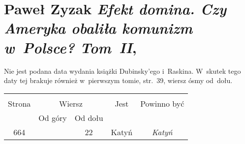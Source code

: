 \documentclass[a4paper,11pt]{article}
\numberwithin{equation}{section}
\begin{document}










\section{Paweł Zyzak \textit{Efekt domina. Czy Ameryka
    obaliła komunizm w~Polsce? Tom~II},
  \cite{ZyzakEfektDominaVolII2016} }




 Nie jest podana data wydania książki
Dubinsky'ego i~Raskina. W~skutek tego daty tej brakuje również
w~pierwszym tomie, str.~39, wiersz ósmy od~dołu.







\begin{center}

  \begin{tabular}{|c|c|c|c|c|}
    \hline
    & \multicolumn{2}{c|}{} & & \\
    Strona & \multicolumn{2}{c|}{Wiersz} & Jest
                              & Powinno być \\ \cline{2-3}
    & Od góry & Od dołu & & \\
    \hline
    664 & & 22 & Katyń & \textit{Katyń} \\
    \hline
  \end{tabular}

\end{center}
\end{document}
